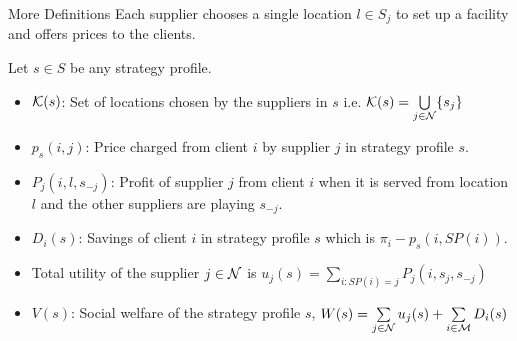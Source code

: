 \documentclass[aspectratio=1610]{beamer}
\begin{document}
\begin{frame}{More Definitions}
Each supplier chooses a single location $l\in S_j$ to set up a facility and offers prices  to the clients. \pause

Let $s\in S$ be any strategy profile.\begin{itemize}
    \item $\mathcal{K}(s)$: Set of locations chosen by the suppliers in $s$ i.e. $\mathcal{K}(s)=\bigcup\limits_{j\in\mathcal{N}}\{s_j\}$\pause
    
    \item $p_s(i,j)$: Price charged from client $i$ by supplier $j$ in strategy profile $s$.\vspace*{3mm}\pause
    
    \item $P_j(i,l,s_{-j})$: Profit of supplier $j$ from client $i$ when it is served from location $l$ and the other suppliers are playing $s_{-j}$.\vspace*{3mm}\pause
    
    \item $D_i(s)$: Savings of client $i$ in strategy profile $s$ which is $\pi_i-p_s(i,SP(i))$.\vspace*{3mm}\pause
    
    \item Total utility of the supplier $j\in\mathcal{N}$ is $u_j(s)=\sum\limits_{i:SP(i)=j}P_j(i,s_j,s_{-j})$\pause
    
    
    \item $V(s)$: Social welfare of the strategy profile  $s$, $W(s)=\sum\limits_{j\in\mathcal{N}}u_j(s)+\sum\limits_{i\in\mathcal{M}}D_i(s)$
\end{itemize}

\end{frame}
\end{document}
